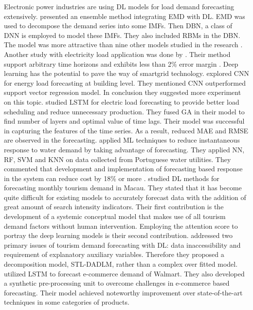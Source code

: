 Electronic power industries are using DL models for load demand forecasting extensively. \citeauthor{qiu_empirical_2017} presented an ensemble method integrating EMD with DL. EMD was used to decompose the demand series into some IMFs. Then DBN, a class of DNN is employed to model these IMFs. They also included RBMs in the DBN. The model was more attractive than nine other models studied in the research \cite{qiu_empirical_2017}.
Another study with electricity load application was done by \citeauthor{torres_deep_2017}. Their method support arbitrary time horizons and exhibits less than 2\% error margin \cite{torres_deep_2017}. 
Deep learning has the potential to pave the way of smartgrid technology. \citeauthor{amarasinghe_deep_2017} explored CNN for energy load forecasting at building level. They mentioned CNN outperformed support vector regression model. In conclusion they suggested more experiment on this topic\cite{amarasinghe_deep_2017}. 
\citeauthor*{bouktif_optimal_2018} studied LSTM for electric load forecasting to provide better load scheduling and reduce unnecessary production. They fused GA in their model to find number of layers and optimal value of time lags. Their model was successful in capturing the features of the time series. As a result, reduced MAE and RMSE are observed in the forecasting\cite{bouktif_optimal_2018}.
\citeauthor*{antunes_short-term_2018} applied ML techniques to reduce instantaneous response to water demand by taking advantage of forecasting. They applied NN, RF, SVM and KNN on data collected from Portuguese water utilities. They commented that development and implementation of forecasting based response in the system can reduce cost by 18\% or more \cite{antunes_short-term_2018}.
\citeauthor{law_tourism_2019} studied DL methods for forecasting monthly tourism demand in Macau. They stated that it has become quite difficult for existing models to accurately forecast data with the addition of great amount of search intensity indicators. Their first contribution is the development of a systemic conceptual model that makes use of all tourism demand factors without human intervention. Employing the attention score to portray the deep learning models is their second contribution\cite{law_tourism_2019}.
\citeauthor*{zhang_tourism_2020} addressed two primary issues of tourism demand forecasting with DL: data inaccessibility and requirement of explanatory auxiliary variables. Therefore they proposed a decomposition model, STL-DADLM, rather than a complex over fitted model\cite{zhang_tourism_2020}.
\citeauthor*{bandara_sales_2019} utilized LSTM to forecast e-commerce demand of Walmart. They also developed a synthetic pre-processing unit to overcome challenges in e-commerce based forecasting. Their model achieved noteworthy improvement over state-of-the-art techniques in some categories of products\cite{bandara_sales_2019}. 
